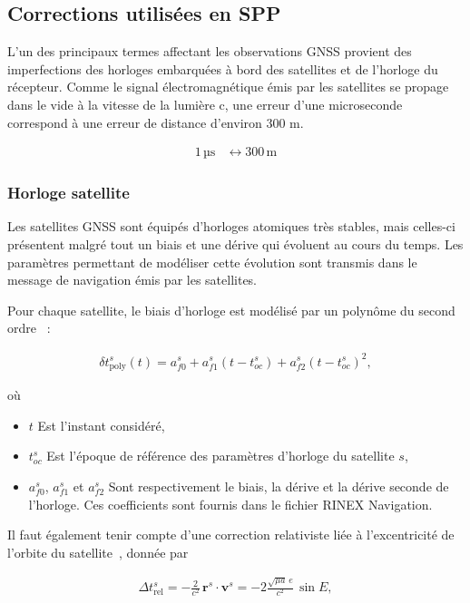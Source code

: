 \subsection{Corrections utilisées en SPP}
\label{new:corrections}

L'un des principaux termes affectant les observations GNSS provient des
imperfections des horloges embarquées à bord des satellites et de l'horloge du
récepteur.
Comme le signal électromagnétique émis par les satellites se propage dans le vide à la vitesse de la
lumière c, une erreur d'une microseconde correspond à une erreur de distance d'environ 300 m.

\begin{align}
1\,\text{µs} &\leftrightarrow 300\,\text{m}
\end{align}
\subsubsection{Horloge satellite}

Les satellites GNSS sont équipés d'horloges atomiques très stables, mais celles-ci présentent malgré tout un biais et une dérive qui évoluent au cours du temps. Les paramètres permettant de modéliser cette évolution sont transmis dans le message de navigation émis par les satellites.

Pour chaque satellite, le biais d'horloge est modélisé par un polynôme du second ordre~\cite{isgps200n} :

\begin{align}
\delta t_{\mathrm{poly}}^s(t)
=
a_{f0}^s
+
a_{f1}^s(t-t_{oc}^s)
+
a_{f2}^s(t-t_{oc}^s)^2,
\end{align}

où

\begin{itemize}
    \item $t$ Est l'instant considéré,
    \item $t_{oc}^s$ Est l'époque de référence des paramètres d'horloge du
    satellite $s$,
    \item $a_{f0}^s$, $a_{f1}^s$ et $a_{f2}^s$ Sont respectivement le biais,
    la dérive et la dérive seconde de l'horloge. Ces coefficients sont fournis
    dans le fichier RINEX Navigation.
\end{itemize}

Il faut également tenir compte d'une correction relativiste liée à l'excentricité de l'orbite du satellite~\cite{ashby2003}, donnée par

\begin{align}
\Delta t_{\mathrm{rel}}^s
=
-\frac{2}{c^2}\,
\mathbf r^s \cdot \mathbf v^s
=
-2\frac{\sqrt{\mu a}\,e}{c^2}\,\sin E,
\end{align}

